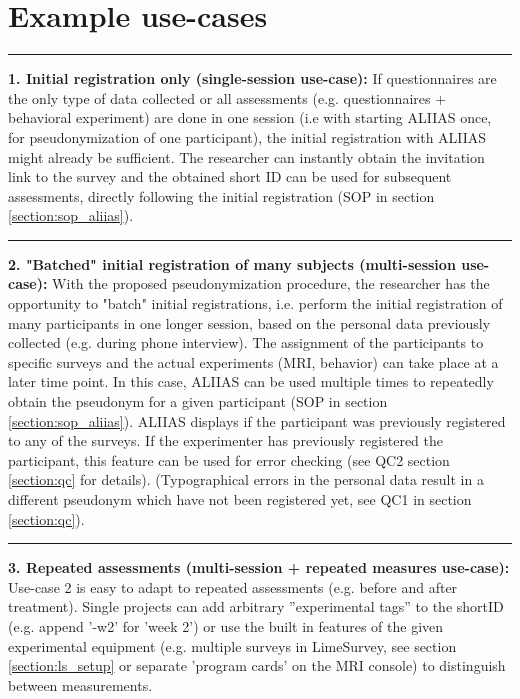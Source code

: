 \section{Example use-cases}
\label{use-case:one-session}
\par\noindent\rule{\textwidth\color{pniblue}}{0.4pt}
\textbf{1. Initial registration only (single-session use-case):}
If questionnaires are the only type of data collected or all assessments (e.g. questionnaires + behavioral experiment) are done in one session (i.e with starting ALIIAS once, for pseudonymization of one participant), the initial registration with ALIIAS might already be sufficient. The researcher can instantly obtain the invitation link to the survey and the obtained short ID can be used for subsequent assessments, directly following the initial registration (SOP in section \ref{section:sop_aliias}).

\par\noindent\rule{\textwidth\color{pniblue}}{0.4pt}
\textbf{2. "Batched" initial registration of many subjects (multi-session use-case):}
With the proposed pseudonymization procedure, the researcher has the opportunity to "batch" initial registrations, i.e. perform the initial registration of many participants in one longer session, based on the personal data previously collected (e.g. during phone interview). The assignment of the participants to specific surveys and the actual experiments (MRI, behavior) can take place at a later time point. In this case, ALIIAS can be used multiple times to repeatedly obtain the pseudonym for a given participant (SOP in section \ref{section:sop_aliias}). ALIIAS displays if the participant was previously registered to any of the surveys. If the experimenter has previously registered the participant, this feature can be used for error checking (see QC2 section \ref{section:qc} for details). (Typographical errors in the personal data result in a different pseudonym which have not been registered yet, see QC1 in section \ref{section:qc}).

\par\noindent\rule{\textwidth\color{pniblue}}{0.4pt}
\textbf{3. Repeated assessments (multi-session + repeated measures use-case):}
Use-case 2 is easy to adapt to repeated assessments (e.g. before and after treatment). Single projects can add arbitrary ”experimental tags” to the shortID (e.g. append ’-w2’ for 'week 2') or use the built in features of the given experimental equipment (e.g. multiple surveys in LimeSurvey, see section \ref{section:ls_setup} or separate ’program cards’ on the MRI console) to distinguish between measurements. 

